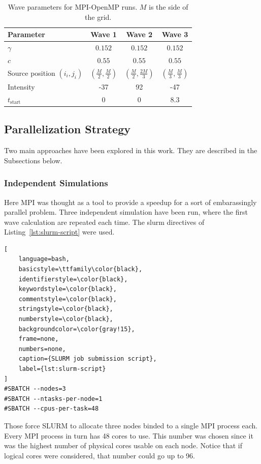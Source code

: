 \begin{table}[h]
  \centering
  \caption{Wave parameters for MPI-OpenMP runs. $M$ is the side of the grid.}
  \label{tab:part2-params}
  \begin{tabular}{lccc}
    \toprule
    Parameter & Wave 1 & Wave 2 & Wave 3 \\
    \midrule
    $\gamma$               & $0.152$ & $0.152$ & $0.152$ \\
    $c$                    & $0.55$ & $0.55$ & $0.55$ \\ [1pt]
    Source position $(i_i, j_i)$     & $(\frac{M}{2},\frac{M}{2})$ &
    $(\frac{M}{2},\frac{2M}{3})$ & $(\frac{M}{3},\frac{M}{3})$  \\ [1pt]
    Intensity &  -37 & 92 & -47\\
    $t_{\text{start}}$  & 0 & 0 & $8.3$ \\
    \bottomrule
  \end{tabular}
\end{table}

\subsection{Parallelization Strategy}
Two main approaches have been explored in this work. They are
described in the Subsections below.
\subsubsection{Independent Simulations}

Here MPI was thought as a tool to
provide a speedup for a sort of embarassingly parallel problem.
Three independent
simulation have been run, where the first wave calculation are
repeated each time.
The slurm directives of Listing~\ref{lst:slurm-script} were used.
\begin{lstlisting}[
    language=bash,
    basicstyle=\ttfamily\color{black},
    identifierstyle=\color{black},
    keywordstyle=\color{black},
    commentstyle=\color{black},
    stringstyle=\color{black},
    numberstyle=\color{black},
    backgroundcolor=\color{gray!15},
    frame=none,
    numbers=none,
    caption={SLURM job submission script},
    label={lst:slurm-script}
]
#SBATCH --nodes=3
#SBATCH --ntasks-per-node=1
#SBATCH --cpus-per-task=48
\end{lstlisting}
Those force SLURM to allocate three nodes binded to a single MPI
process each. Every
MPI process in turn has 48 cores to use. This number was chosen since it was
the highest number of physical cores usable on each node. Notice that
if logical cores
were considered, that number could go up to 96.

